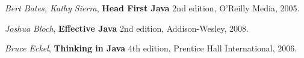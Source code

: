 \begin{thebibliography}{99}
  
  
    \textit{Bert Bates, Kathy Sierra},
	\textbf{Head First Java} 2nd edition, 
	O'Reilly Media, 2005.

    \textit{Joshua Bloch},
    \textbf{Effective Java} 2nd edition, 
	Addison-Wesley, 2008.
	
    \textit{Bruce Eckel},
	\textbf{Thinking in Java} 4th edition, 
	Prentice Hall International, 2006.

\end{thebibliography}
